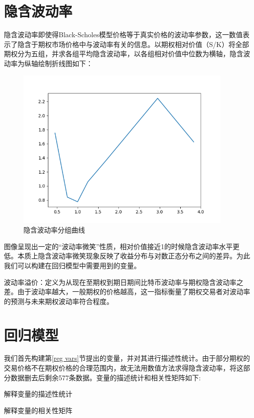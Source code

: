\section{隐含波动率}
隐含波动率即使得Black-Scholes模型价格等于真实价格的波动率参数，这一数值表示了隐含于期权市场价格中与波动率有关的信息。以期权相对价值（S/K）将全部期权分为五组，并求各组平均隐含波动率，以各组相对价值中位数为横轴，隐含波动率为纵轴绘制折线图如下：
\begin{figure}[H]
    \begin{small}
        \begin{center}
            \includegraphics[width=0.95\textwidth]{figures/mean_isd.png}
        \end{center}
        \caption{隐含波动率分组曲线}
        \label{fig:mean_isd}
    \end{small}
\end{figure}
图像呈现出一定的“波动率微笑”性质，相对价值接近1的时候隐含波动率水平更低。本质上隐含波动率微笑现象反映了收益分布与对数正态分布之间的差异。为此我们可以构建在回归模型中需要用到的变量。
\par{
    波动率溢价：定义为从现在至期权到期日期间比特币波动率与期权隐含波动率之差。由于波动率越大，一般期权的价格越高，这一指标衡量了期权交易者对波动率的预测与未来期权波动率符合程度。
}

\section{回归模型}
我们首先构建第\ref{reg vars}节提出的变量，并对其进行描述性统计。由于部分期权的交易价格不在期权价格的合理范围内，故无法用数值方法求得隐含波动率，将这部分数据删去后剩余577条数据。变量的描述统计和相关性矩阵如下:
\newpage
{}
\begin{landscape} 
    \begin{table}[H]
        \caption{解释变量的描述性统计}
        \resizebox{\linewidth}{!}{
        
        }
    \end{table}
    \begin{table}[H]
        \caption{解释变量的相关性矩阵}
        \resizebox{\linewidth}{!}{    }
    \end{table}    
\end{landscape}

